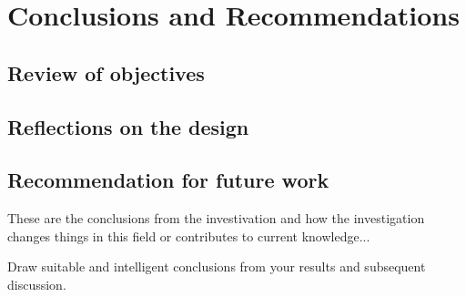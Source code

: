 \chapter{Conclusions and Recommendations}

\section{Review of objectives}
\section{Reflections on the design}
\section{Recommendation for future work}
These are the conclusions from the investivation and how the investigation changes things in this field or contributes to current knowledge...

Draw suitable and intelligent conclusions from your results and subsequent discussion.
